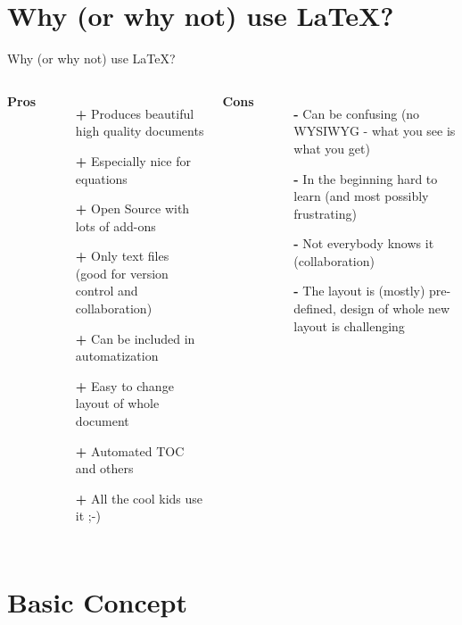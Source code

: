 \documentclass[presentation, aspectratio=1610]{beamer}
\begin{document}
	\section{Why (or why not) use \LaTeX ?}
	\begin{frame}{Why (or why not) use \LaTeX ?}
	\begin{columns}[t]
		{\large \color{green}\textbf{Pros}}
		\begin{itemize}
			\item [\color{green}\textbf{+}] Produces beautiful high quality documents
			\item [\color{green}\textbf{+}] Especially nice for equations
			\item [\color{green}\textbf{+}] Open Source with lots of add-ons
			\item [\color{green}\textbf{+}] Only text files (good for version control and
			collaboration)
			\item [\color{green}\textbf{+}] Can be included in automatization
			\item[\color{green}\textbf{+}] \color{gray} Easy to change layout of whole document
			\item[\color{green}\textbf{+}] Automated TOC and others
			\item[\color{green}\textbf{+}] All the cool kids use it ;-)
		\end{itemize}
	\pause
			{\large \color{red}\textbf{Cons}}
		\begin{itemize}
			\item [\color{red}\textbf{-}] Can be confusing (no WYSIWYG - what you see is what you get)
			\item [\color{red}\textbf{-}] In the beginning hard to learn (and most possibly frustrating)
			\item [\color{red}\textbf{-}] Not everybody knows it (collaboration)
			\item [\color{red}\textbf{-}] The layout is (mostly) pre-defined, design of whole new
			layout is challenging
		\end{itemize}
	\end{columns}
	\end{frame}

	\section{Basic Concept}
\end{document}
